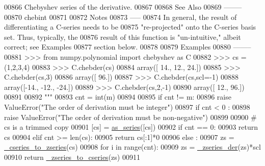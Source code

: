 \begin{DoxyCode}
00866 \textcolor{stringliteral}{        Chebyshev series of the derivative.}
00867 \textcolor{stringliteral}{}
00868 \textcolor{stringliteral}{    See Also}
00869 \textcolor{stringliteral}{    --------}
00870 \textcolor{stringliteral}{    chebint}
00871 \textcolor{stringliteral}{}
00872 \textcolor{stringliteral}{    Notes}
00873 \textcolor{stringliteral}{    -----}
00874 \textcolor{stringliteral}{    In general, the result of differentiating a C-series needs to be}
00875 \textcolor{stringliteral}{    "re-projected" onto the C-series basis set. Thus, typically, the}
00876 \textcolor{stringliteral}{    result of this function is "un-intuitive," albeit correct; see Examples}
00877 \textcolor{stringliteral}{    section below.}
00878 \textcolor{stringliteral}{}
00879 \textcolor{stringliteral}{    Examples}
00880 \textcolor{stringliteral}{    --------}
00881 \textcolor{stringliteral}{    >>> from numpy.polynomial import chebyshev as C}
00882 \textcolor{stringliteral}{    >>> cs = (1,2,3,4)}
00883 \textcolor{stringliteral}{    >>> C.chebder(cs)}
00884 \textcolor{stringliteral}{    array([ 14.,  12.,  24.])}
00885 \textcolor{stringliteral}{    >>> C.chebder(cs,3)}
00886 \textcolor{stringliteral}{    array([ 96.])}
00887 \textcolor{stringliteral}{    >>> C.chebder(cs,scl=-1)}
00888 \textcolor{stringliteral}{    array([-14., -12., -24.])}
00889 \textcolor{stringliteral}{    >>> C.chebder(cs,2,-1)}
00890 \textcolor{stringliteral}{    array([ 12.,  96.])}
00891 \textcolor{stringliteral}{}
00892 \textcolor{stringliteral}{    """}
00893     cnt = int(m)
00894 
00895     \textcolor{keywordflow}{if} cnt != m:
00896         \textcolor{keywordflow}{raise} ValueError(\textcolor{stringliteral}{"The order of derivation must be integer"})
00897     \textcolor{keywordflow}{if} cnt < 0 :
00898         \textcolor{keywordflow}{raise} ValueError(\textcolor{stringliteral}{"The order of derivation must be non-negative"})
00899 
00900     \textcolor{comment}{# cs is a trimmed copy}
00901     [cs] = \hyperlink{namespacepyneb_1_1utils_1_1polyutils_a9c3751d438f0f75922155c7823fe2699}{as\_series}([cs])
00902     \textcolor{keywordflow}{if} cnt == 0:
00903         \textcolor{keywordflow}{return} cs
00904     \textcolor{keywordflow}{elif} cnt >= len(cs):
00905         \textcolor{keywordflow}{return} cs[:1]*0
00906     \textcolor{keywordflow}{else} :
00907         zs = \hyperlink{namespacepyneb_1_1utils_1_1chebyshev_a3340d022485b954c9c722b6eaa456ebb}{\_cseries\_to\_zseries}(cs)
00908         \textcolor{keywordflow}{for} i \textcolor{keywordflow}{in} range(cnt):
00909             zs = \hyperlink{namespacepyneb_1_1utils_1_1chebyshev_a82377769dc2ed2e38828ac99897ff554}{\_zseries\_der}(zs)*scl
00910         \textcolor{keywordflow}{return} \hyperlink{namespacepyneb_1_1utils_1_1chebyshev_aa21c9418f1740d12b80ab1563f49ce0b}{\_zseries\_to\_cseries}(zs)
00911 

\end{DoxyCode}
